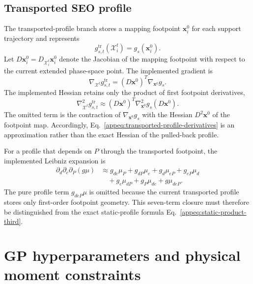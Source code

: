 \documentclass[
  11pt,
  letterpaper,
  onehalfspacing,
  normalmargins,
  equalmargins,
  oneside
]{ut-thesis}
\begin{document}
\subsection{Transported SEO profile}
\label{appsubsec:transported-profile}

The transported-profile branch stores a mapping footpoint
\(\mathbf x_i^0\) for each support trajectory and represents
\begin{equation}
g_{s,t}^{\mathrm{tr}}
(\boldsymbol{\mathcal X}_i^t)
=
g_s(\mathbf x_i^0).
\label{appeq:transported-profile}
\end{equation}
Let
\(
D\mathbf x_i^0
=
D_{\boldsymbol{\mathcal X}_i^t}\mathbf x_i^0
\)
denote the Jacobian of the mapping footpoint with respect to the current
extended phase-space point. The implemented gradient is
\begin{equation}
\nabla_{\boldsymbol{\mathcal X}^t}
 g_{s,t}^{\mathrm{tr}}
=
\left(D\mathbf x^0\right)^T
\nabla_{\mathbf x^0}g_s.
\label{appeq:transported-profile-first}
\end{equation}
The implemented Hessian retains only the product of first footpoint
derivatives,
\begin{equation}
\nabla_{\boldsymbol{\mathcal X}^t}^{2}
 g_{s,t}^{\mathrm{tr}}
\approx
\left(D\mathbf x^0\right)^T
\nabla_{\mathbf x^0}^{2}g_s
\left(D\mathbf x^0\right).
\label{appeq:transported-profile-derivatives}
\end{equation}
The omitted term is the contraction of
\(\nabla_{\mathbf x^0}g_s\) with the Hessian
\(D^2\mathbf x^0\) of the footpoint map. Accordingly,
Eq.~\eqref{appeq:transported-profile-derivatives} is an approximation rather
than the exact Hessian of the pulled-back profile.

For a profile that depends on \(P\) through the transported footpoint, the
implemented Leibniz expansion is
\begin{align}
\partial_d\partial_e\partial_P(g\mu)
&\approx
g_{de}\mu_P
+
g_{dP}\mu_e
+
g_d\mu_{eP}
+
g_{eP}\mu_d
\nonumber\\
&\quad
+
g_e\mu_{dP}
+
g_P\mu_{de}
+
g\mu_{deP}.
\label{appeq:transported-product-third}
\end{align}
The pure profile term \(g_{deP}\mu\) is omitted because the current transported
profile stores only first-order footpoint geometry.  This seven-term closure
must therefore be distinguished from the exact static-profile formula
Eq.~\eqref{appeq:static-product-third}.

\section{GP hyperparameters and physical moment constraints}
\label{appsec:gp-fitting}
\end{document}
